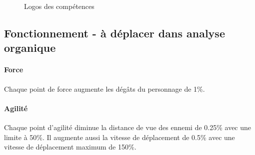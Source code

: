 \documentclass[11pt, a4paper, oneside]{report}
\begin{document}
\begin{figure}[ht]
\centering
{}
%
\caption{Logos des compétences}
\label{fig:competences}
\end{figure}

\subsection{Fonctionnement - à déplacer dans analyse organique}
\paragraph{Force}Chaque point de force augmente les dégâts du personnage de 1\%.
\paragraph{Agilité}Chaque point d'agilité diminue la distance de vue des ennemi de 0.25\% avec une limite à 50\%. Il augmente aussi la vitesse de déplacement de 0.5\% avec une vitesse de déplacement maximum de 150\%.
\end{document}
